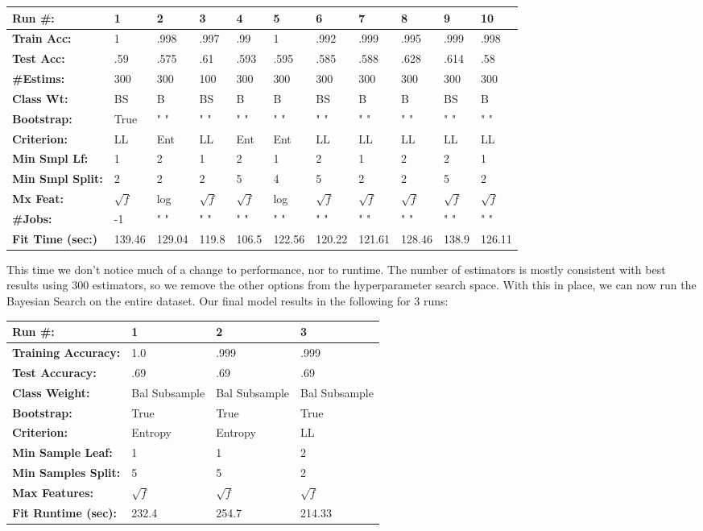 \documentclass[titlepage]{article}
\begin{document}
\begin{tabular}{ l | l | l | l | l | l | l | l | l | l | l }
	\textbf{Run \#:} & 1 & 2 & 3 & 4 & 5 & 6 & 7  & 8 & 9 & 10\\		
	\hline
	\textbf{Train Acc:} & 1 & .998 & .997 & .99 & 1 & .992 & .999  & .995 & .999 & .998 \\
	\textbf{Test Acc:} & .59 & .575 & .61 & .593 & .595 & .585 & .588 & .628 & .614 & .58 \\
	\textbf{\#Estims:} &  300 & 300 & 100 & 300 & 300 & 300 & 300 & 300 & 300 & 300 \\  
	\textbf{Class Wt:} & BS & B & BS & B & B & BS & B & B & BS & B  \\
	\textbf{Bootstrap:} & True & " " & " " & " " & " " & " " & " " & " " & " " & " "  \\
	\textbf{Criterion:} & LL  & Ent & LL & Ent & Ent & LL  & LL & LL & LL & LL \\
	\textbf{Min Smpl Lf:} & 1 & 2 & 1 & 2 & 1 & 2 & 1 & 2 & 2 & 1 \\
	\textbf{Min Smpl Split:} & 2 & 2 & 2 & 5 & 4 & 5 & 2 & 2 & 5 & 2 \\
	\textbf{Mx Feat:} & $\sqrt{f}$ & log & $\sqrt{f}$ & $\sqrt{f}$ & log & $\sqrt{f}$  & $\sqrt{f}$ & $\sqrt{f}$ & $\sqrt{f}$ & $\sqrt{f}$ \\
	\textbf{\#Jobs:} & -1  & " " & " " & " " & " " & " " & " " & " " & " " & " " \\
	\textbf{Fit Time (sec:)} & 139.46 & 129.04 & 119.8 & 106.5 & 122.56 & 120.22 & 121.61 & 128.46 & 138.9 & 126.11 \\
\end{tabular}
\vspace{.2cm}\newline

This time we don't notice much of a change to performance, nor to runtime.  The number of estimators is mostly consistent with best results using 300 estimators, so we remove the other options from the hyperparameter search space.  With this in place, we can now run the Bayesian Search on the entire dataset. Our final model results in the following for 3 runs:  

\begin{tabular}{ l | l | l | l }
	\textbf{Run \#:} & 1 & 2 & 3 \\
	\hline
	\textbf{Training Accuracy:} & 1.0 &  .999 & .999 \\
	\textbf{Test Accuracy:} & .69 & .69 & .69 \\
	\textbf{Class Weight:} & Bal Subsample  &  Bal Subsample & Bal Subsample \\
	\textbf{Bootstrap:} & True & True & True \\
	\textbf{Criterion:}  & Entropy & Entropy & LL \\
	\textbf{Min Sample Leaf:} & 1 & 1  &2 \\
	\textbf{Min Samples Split:} & 5 & 5 & 2 \\
	\textbf{Max Features:} & $\sqrt{f}$ & $\sqrt{f}$ & $\sqrt{f}$  \\
	\textbf{Fit Runtime (sec):} &  232.4  & 254.7 & 214.33 \\
\end{tabular}
\end{document}
